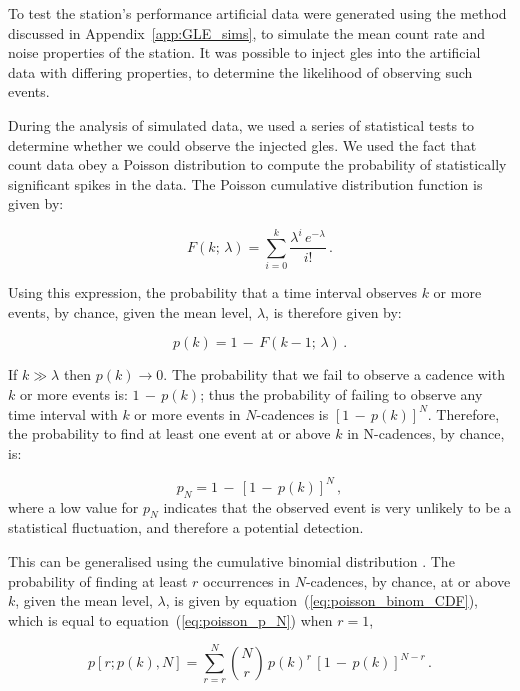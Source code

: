 To test the station's performance artificial data were generated using the method discussed in Appendix~\ref{app:GLE_sims}, to simulate the mean count rate and noise properties of the station. It was possible to inject \glspl{gle} into the artificial data with differing properties, to determine the likelihood of observing such events.

During the analysis of simulated data, we used a series of statistical tests to determine whether we could observe the injected \glspl{gle}. We used the fact that count data obey a Poisson distribution to compute the probability of statistically significant spikes in the data. The Poisson cumulative distribution function is given by:

\begin{equation}
F(k; \, \lambda) = \sum_{i=0}^{k}  \frac{\lambda^i \, e^{-\lambda}}{i!} \, .
\label{eq:poisson_CDF}
\end{equation}


Using this expression, the probability that a time interval observes $k$ or more events, by chance, given the mean level, $\lambda$, is therefore given by: 

\begin{equation}
p(k) = 1 \, - \, F(k-1; \, \lambda) \, .
\label{eq:poisson_SF}
\end{equation}

If $k\gg\lambda$ then $p(k)\to0$. The probability that we fail to observe a cadence with $k$ or more events is: $1 \, - \, p(k)$; thus the probability of failing to observe any time interval with $k$ or more events in $N$-cadences is $[1 \, - \, p(k)]^N$. Therefore, the probability to find at least one event at or above $k$ in N-cadences, by chance, is:

\begin{equation}
p_N = 1\, - \, [1 \, - \, p(k)]^N \, ,
\label{eq:poisson_p_N}
\end{equation}
%
where a low value for $p_N$ indicates that the observed event is very unlikely to be a statistical fluctuation, and therefore a potential detection.

This can be generalised using the cumulative binomial distribution \citep{basu_asteroseismic_2017}. The probability of finding at least $r$ occurrences in $N$-cadences, by chance, at or above $k$, given the mean level, $\lambda$, is given by equation~(\ref{eq:poisson_binom_CDF}), which is equal to equation~(\ref{eq:poisson_p_N}) when $r=1$,

\begin{equation}
p[r; p(k), N] = \sum_{r=r}^{N} \binom{N}{r} \, p(k)^r \, [1 \, - \, p(k)]^{N-r} \, .
\label{eq:poisson_binom_CDF}
\end{equation}

